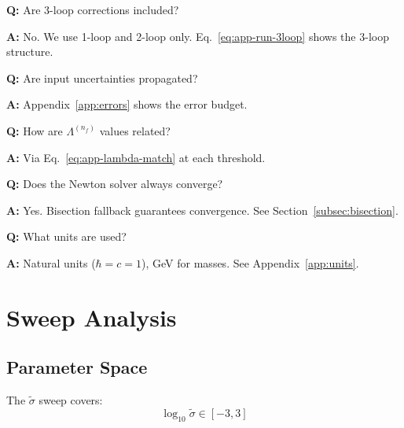 \documentclass[11pt,a4paper]{article}
\theoremstyle{definition}
\begin{document}
\begin{trapbox}
\textbf{Q:} Are 3-loop corrections included?

\textbf{A:} No. We use 1-loop and 2-loop only.
Eq.~\eqref{eq:app-run-3loop} shows the 3-loop structure.
\end{trapbox}

\begin{trapbox}
\textbf{Q:} Are input uncertainties propagated?

\textbf{A:} Appendix~\ref{app:errors} shows the error budget.
\end{trapbox}

\begin{trapbox}
\textbf{Q:} How are $\Lambda^{(n_f)}$ values related?

\textbf{A:} Via Eq.~\eqref{eq:app-lambda-match} at each threshold.
\end{trapbox}

\begin{trapbox}
\textbf{Q:} Does the Newton solver always converge?

\textbf{A:} Yes. Bisection fallback guarantees convergence.
See Section~\ref{subsec:bisection}.
\end{trapbox}

\begin{trapbox}
\textbf{Q:} What units are used?

\textbf{A:} Natural units ($\hbar = c = 1$), GeV for masses.
See Appendix~\ref{app:units}.
\end{trapbox}

\section{Sweep Analysis}
\label{app:sweep}

\subsection{Parameter Space}
\label{subsec:param-space}

The $\tilde{\sigma}$ sweep covers:
\begin{equation}
\label{eq:app-sigma-range}
\log_{10}\tilde{\sigma} \in [-3, 3]
\end{equation}
\end{document}

